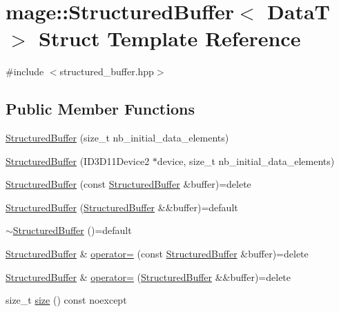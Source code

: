 \hypertarget{structmage_1_1_structured_buffer}{}\section{mage\+:\+:Structured\+Buffer$<$ DataT $>$ Struct Template Reference}
\label{structmage_1_1_structured_buffer}


{\ttfamily \#include $<$structured\+\_\+buffer.\+hpp$>$}

\subsection*{Public Member Functions}
\begin{DoxyCompactItemize}
\item 
\hyperlink{structmage_1_1_structured_buffer_ad384318eca9a617f61f81472ea68f32e}{Structured\+Buffer} (size\+\_\+t nb\+\_\+initial\+\_\+data\+\_\+elements)
\item 
\hyperlink{structmage_1_1_structured_buffer_a7b3a6a86059881526d4ae49dffefb697}{Structured\+Buffer} (I\+D3\+D11\+Device2 $\ast$device, size\+\_\+t nb\+\_\+initial\+\_\+data\+\_\+elements)
\item 
\hyperlink{structmage_1_1_structured_buffer_aa017416099a12305d0177094c768150e}{Structured\+Buffer} (const \hyperlink{structmage_1_1_structured_buffer}{Structured\+Buffer} \&buffer)=delete
\item 
\hyperlink{structmage_1_1_structured_buffer_a455bd930f39f5fdf6af4f453694997da}{Structured\+Buffer} (\hyperlink{structmage_1_1_structured_buffer}{Structured\+Buffer} \&\&buffer)=default
\item 
\hyperlink{structmage_1_1_structured_buffer_a02ab1d322e1aef0c608b85224b80dbcf}{$\sim$\+Structured\+Buffer} ()=default
\item 
\hyperlink{structmage_1_1_structured_buffer}{Structured\+Buffer} \& \hyperlink{structmage_1_1_structured_buffer_ac00255155ab1eb61244392adcf262d40}{operator=} (const \hyperlink{structmage_1_1_structured_buffer}{Structured\+Buffer} \&buffer)=delete
\item 
\hyperlink{structmage_1_1_structured_buffer}{Structured\+Buffer} \& \hyperlink{structmage_1_1_structured_buffer_a2647510e153d15b89f860e2a5c68e231}{operator=} (\hyperlink{structmage_1_1_structured_buffer}{Structured\+Buffer} \&\&buffer)=delete
\item 
size\+\_\+t \hyperlink{structmage_1_1_structured_buffer_a1e9ccab07c0f78ff1a8e4d8a0590f79e}{size} () const noexcept

\end{DoxyCompactItemize}
